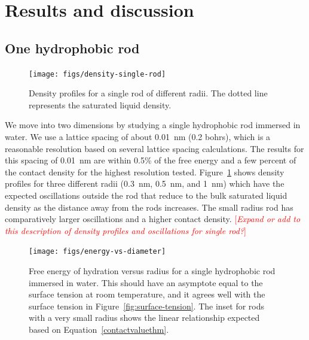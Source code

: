 \documentclass[letterpaper,twocolumn,amsmath,amssymb,prb]{revtex4-1}
\newcommand{\needsworknow}[1]{\textcolor{red}{[\emph{#1}]}}
\begin{document}
\section{Results and discussion}

\subsection{One hydrophobic rod}

\begin{figure}
\begin{center}
\texttt{[image: figs/density-single-rod]}
\end{center}
\caption{ Density profiles for a single rod of different radii. The dotted line
represents the saturated liquid density.  }
\label{fig:density-single-rod}
\end{figure}

We move into two dimensions by studying a single hydrophobic rod
immersed in water. We use a lattice spacing of about 0.01~nm (0.2 bohrs), 
which is a reasonable resolution based on several lattice spacing calculations.
The results for this spacing of 0.01~nm are within 0.5\% of the free energy 
and a few percent of the contact
density for the highest resolution tested.
Figure~\ref{fig:density-single-rod} shows density
profiles for three different radii (0.3~nm, 0.5~nm, and 1~nm) which have the
expected oscillations outside the rod that reduce to the bulk saturated liquid
density as the distance away from the rods increases. The small radius
rod has comparatively larger oscillations and a higher contact density.
\needsworknow{Expand or add to this description of density profiles and
oscillations for single rod?}

\begin{figure}
\begin{center}
\texttt{[image: figs/energy-vs-diameter]}
\end{center}
\caption{ Free energy of hydration versus radius for a single hydrophobic rod
immersed in water. This should have an asymptote equal to the surface
tension at room temperature, and it agrees well with the surface tension in
Figure~\ref{fig:surface-tension}. The inset for rods with a very small 
radius shows the linear relationship expected based on 
Equation~\ref{contactvaluethm}.}
\label{fig:energy-vs-diameter}
\end{figure}
\end{document}
